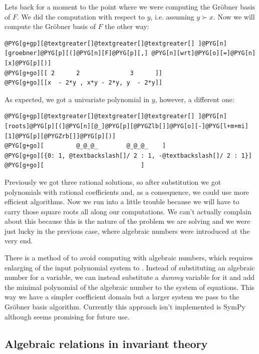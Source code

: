 Lets back for a moment to the point where we were computing the Gröbner basis of $F$. We
did the computation with respect to $y$, i.e. assuming $y \succ x$. Now we will compute the
Gröbner basis of $F$ the other way:

\begin{Verbatim}[commandchars=@\[\]]
@PYG[g+gp][@textgreater[]@textgreater[]@textgreater[] ]@PYG[n][groebner]@PYG[p][(]@PYG[n][F]@PYG[p][,] @PYG[n][wrt]@PYG[o][=]@PYG[n][x]@PYG[p][)]
@PYG[g+go][[ 2      2              3      ]]
@PYG[g+go][[x  - 2*y , x*y - 2*y, y  - 2*y]]
\end{Verbatim}
\noindent
As expected, we got a univariate polynomial in $y$, however, a different one:

\begin{Verbatim}[commandchars=@\[\]]
@PYG[g+gp][@textgreater[]@textgreater[]@textgreater[] ]@PYG[n][roots]@PYG[p][(]@PYG[n][@_]@PYG[p][@PYGZlb[]]@PYG[o][-]@PYG[l+m+mi][1]@PYG[p][@PYGZrb[]]@PYG[p][)]
@PYG[g+go][         @_@_@_        @_@_@_    ]
@PYG[g+go][{0: 1, @textbackslash[]/ 2 : 1, -@textbackslash[]/ 2 : 1}]
@PYG[g+go][                           ]
\end{Verbatim}
\noindent
Previously we got three rational solutions, so after substitution we got polynomials with
rational coefficients and, as a consequence, we could use more efficient algorithms. Now
we run into a little trouble because we will have to carry those square roots all along
our computations. We can't actually complain about this because this is the nature of the
problem we are solving and we were just lucky in the previous case, where algebraic numbers
were introduced at the very end.

There is a method of \cite{Strzebonski1997computing} to avoid computing with algebraic numbers, which
requires enlarging of the input polynomial system to . Instead of substituting
an algebraic number for a variable, we can instead substitute a \emph{dummy} variable for it and add
the minimal polynomial of the algebraic number to the system of equations. This way we have
a simpler coefficient domain but a larger system we pass to the Gröbner basis algorithm.
Currently this approach isn't implemented is SymPy although seems promising for future use.


\subsection{Algebraic relations in invariant theory}

